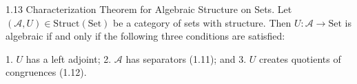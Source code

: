 1.13 Characterization Theorem for Algebraic Structure on Sets. Let $(\mathcal{A}, U) \in \text{Struct}(\text{Set})$ be a category of sets with structure. Then $U: \mathcal{A} \longrightarrow \text{Set}$ is algebraic if and only if the following three conditions are satisfied:

1. $U$ has a left adjoint;
2. $\mathcal{A}$ has separators (1.11); and
3. $U$ creates quotients of congruences (1.12).